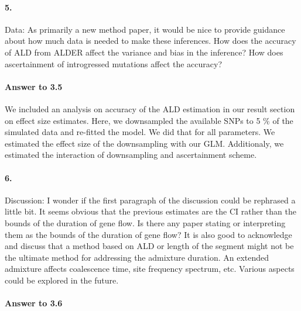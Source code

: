 \documentclass[11pt]{article}
\let\oldparagraph\paragraph
\renewcommand{\paragraph}[1]{\oldparagraph{#1}\mbox{}}
\begin{document}
\paragraph{5.} 
Data: As primarily a new method paper, it would be nice to provide guidance about how much data is needed to make these inferences. 
How does the accuracy of ALD from ALDER affect the variance and bias in the inference? 
How does ascertainment of introgressed mutations affect the accuracy? 

\paragraph{Answer to 3.5}
We included an analysis on accuracy of the ALD estimation in our result section on effect size estimates. Here, we downsampled the available SNPs to 5 \% of the simulated data and re-fitted the model. We did that for all parameters. We estimated the effect size of the downsampling with our GLM. Additionaly, we estimated the interaction of downsampling and ascertainment scheme. 

\paragraph{6.} 
Discussion: I wonder if the first paragraph of the discussion could be rephrased a little bit. It seems obvious that the previous estimates are the CI rather than the bounds of the duration of gene flow. Is there any paper stating or interpreting them as the bounds of the duration of gene flow? It is also good to acknowledge and discuss that a method based on ALD or length of the segment might not be the ultimate method for addressing the admixture duration. An extended admixture affects coalescence time, site frequency spectrum, etc. Various aspects could be explored in the future.

\paragraph{Answer to 3.6}
\end{document}

